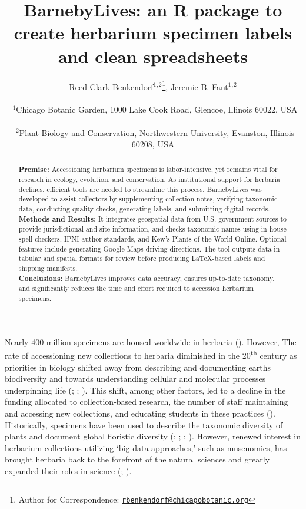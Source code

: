 \documentclass[
]{article}
\title{BarnebyLives: an R package to create herbarium specimen labels
and clean spreadsheets}
\author{Reed Clark Benkendorf\(^1\)\(^,\)\(^2\)\footnote{Author for
  Correspondence:
  \href{mailto:rbenkendorf@chicagobotanic.org}{\nolinkurl{rbenkendorf@chicagobotanic.org}}},
Jeremie B. Fant\(^1\)\(^,\)\(^2\)\\
\strut ~\(^1\)Chicago Botanic Garden, 1000 Lake Cook Road, Glencoe,
Illinois 60022, USA\\
\strut ~\(^2\)Plant Biology and Conservation, Northwestern University,
Evanston, Illinois 60208, USA}
\date{}
\begin{document}
\maketitle
\begin{abstract}
\noindent \textbf{Premise:} Accessioning herbarium specimens is
labor-intensive, yet remains vital for research in ecology, evolution,
and conservation. As institutional support for herbaria declines,
efficient tools are needed to streamline this process. BarnebyLives was
developed to assist collectors by supplementing collection notes,
verifying taxonomic data, conducting quality checks, generating labels,
and submitting digital records. \textbf{Methods and Results:} It
integrates geospatial data from U.S. government sources to provide
jurisdictional and site information, and checks taxonomic names using
in-house spell checkers, IPNI author standards, and Kew's Plants of the
World Online. Optional features include generating Google Maps driving
directions. The tool outputs data in tabular and spatial formats for
review before producing LaTeX-based labels and shipping manifests.\\
\textbf{Conclusions:} BarnebyLives improves data accuracy, ensures
up-to-date taxonomy, and significantly reduces the time and effort
required to accession herbarium specimens.
\end{abstract}

Nearly 400 million specimens are housed worldwide in herbaria
(). However, The rate of
accessioning new collections to herbaria diminished in the
20\textsuperscript{th} century as priorities in biology shifted away
from describing and documenting earths biodiversity and towards
understanding cellular and molecular processes underpinning life
(;
;
). This shift, among
other factors, led to a decline in the funding allocated to
collection-based research, the number of staff maintaining and accessing
new collections, and educating students in these practices
(). Historically, specimens
have been used to describe the taxonomic diversity of plants and
document global floristic diversity
(;
;
;
). However,
renewed interest in herbarium collections utilizing `big data
approaches,' such as museuomics, has brought herbaria back to the
forefront of the natural sciences and grearly expanded their roles in
science (;
).
\end{document}
